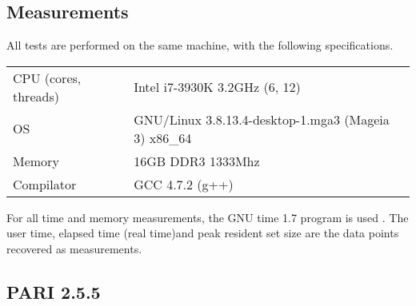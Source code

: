 \documentclass[a4paper]{article}
\newcommand{\code}{\texttt}
\begin{document}

\subsection{Measurements}
All tests are performed on the same machine, with the following specifications.

\begin{center}
\begin{tabular}{l|l}
CPU (cores, threads) & Intel i7-3930K 3.2GHz (6, 12) \\ 
OS & GNU/Linux 3.8.13.4-desktop-1.mga3 (Mageia 3) x86\_64 \\ 
Memory & 16GB DDR3 1333Mhz \\ 
Compilator & GCC 4.7.2 (g++) \\ 
\end{tabular}
\end{center}

For all time and memory measurements, the GNU time 1.7 program is used \cite{time}. The user time, elapsed time (real time)\footnotemark and peak resident set size are the data points recovered as measurements.


% 

\subsection{PARI 2.5.5}
\end{document}
